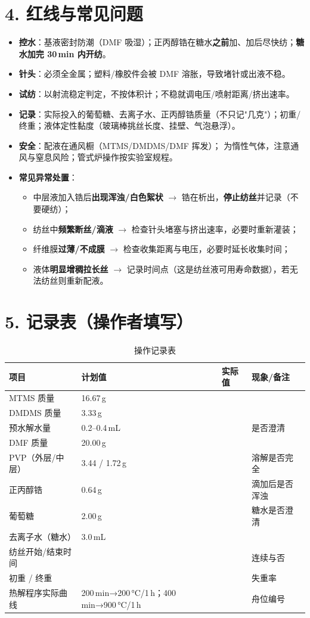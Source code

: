 \documentclass[a4paper, 11pt]{ctexart}
\begin{document}
\section*{4. 红线与常见问题}
\begin{itemize}
  \item \textbf{控水}：基液密封防潮（DMF 吸湿）；正丙醇锆在糖水\textbf{之前}加、加后尽快纺；\textbf{糖水加完 30\,min 内开纺}。
  \item \textbf{针头}：必须全金属；塑料/橡胶件会被 DMF 溶胀，导致堵针或出液不稳。
  \item \textbf{试纺}：以射流稳定判定，不按体积计；不稳就调电压/喷射距离/挤出速率。
  \item \textbf{记录}：实际投入的葡萄糖、去离子水、正丙醇锆质量（不只记"几克"）；初重/终重；液体定性黏度（玻璃棒挑丝长度、挂壁、气泡悬浮）。
  \item \textbf{安全}：配液在通风橱（MTMS/DMDMS/DMF 挥发）； 为惰性气体，注意通风与窒息风险；管式炉操作按实验室规程。
  \item \textbf{常见异常处置}：
    \begin{itemize}
      \item 中层液加入锆后\textbf{出现浑浊/白色絮状} $\rightarrow$ 锆在析出，\textbf{停止纺丝}并记录（不要硬纺）；
      \item 纺丝中\textbf{频繁断丝/滴液} $\rightarrow$ 检查针头堵塞与挤出速率，必要时重新灌装；
      \item 纤维膜\textbf{过薄/不成膜} $\rightarrow$ 检查收集距离与电压，必要时延长收集时间；
      \item 液体\textbf{明显增稠拉长丝} $\rightarrow$ 记录时间点（这是纺丝液可用寿命数据），若无法纺丝则重新配液。
    \end{itemize}
\end{itemize}

\section*{5. 记录表（操作者填写）}
\begin{table}[htbp]
\centering
\caption{操作记录表}
\begin{tabularx}{\textwidth}{l l l X}
\toprule
项目 & 计划值 & 实际值 & 现象/备注 \\
\midrule
MTMS 质量 & 16.67\,g & & \\
DMDMS 质量 & 3.33\,g & & \\
预水解水量 & 0.2--0.4\,mL & & 是否澄清 \\
DMF 质量 & 20.00\,g & & \\
PVP（外层/中层） & 3.44 / 1.72\,g & & 溶解是否完全 \\
正丙醇锆 & 0.64\,g & & 滴加后是否浑浊 \\
葡萄糖 & 2.00\,g & & 糖水是否澄清 \\
去离子水（糖水） & 3.0\,mL & & \\
纺丝开始/结束时间 & & & 连续与否 \\
初重 / 终重 & & & 失重率 \\
热解程序实际曲线 & 200\,min→200\,°C/1\,h；400\,min→900\,°C/1\,h & & 舟位编号 \\
\bottomrule
\end{tabularx}
\end{table}
\end{document}
